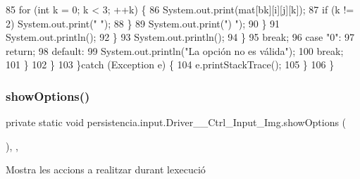 \begin{DoxyCode}
85                                 \textcolor{keywordflow}{for} (\textcolor{keywordtype}{int} k = 0; k < 3; ++k) \{
86                                     System.out.print(mat[bk][i][j][k]);
87                                     \textcolor{keywordflow}{if} (k != 2) System.out.print(\textcolor{stringliteral}{" "});
88                                 \}
89                                 System.out.print(\textcolor{stringliteral}{")  "});
90                             \}
91                             System.out.println();
92                         \}
93                         System.out.println();
94                     \}
95                 \textcolor{keywordflow}{break};
96                 \textcolor{keywordflow}{case} \textcolor{stringliteral}{"0"}:
97                     \textcolor{keywordflow}{return};
98                 \textcolor{keywordflow}{default}:
99                     System.out.println(\textcolor{stringliteral}{"La opción no es válida"});
100                 \textcolor{keywordflow}{break};
101             \}
102         \}
103     \}\textcolor{keywordflow}{catch} (Exception e) \{
104         e.printStackTrace();
105     \}
106     \}
\end{DoxyCode}
\mbox{\label{classpersistencia_1_1input_1_1Driver____Ctrl__Input__Img_a63892d1060c96a4478541bf0feff579d}} 
\subsubsection{\texorpdfstring{show\+Options()}{showOptions()}}
{\footnotesize\ttfamily private static void persistencia.\+input.\+Driver\+\_\+\+\_\+\+Ctrl\+\_\+\+Input\+\_\+\+Img.\+show\+Options (\begin{DoxyParamCaption}{ }\end{DoxyParamCaption})\hspace{0.3cm}{\ttfamily [inline]}, {\ttfamily [static]}, {\ttfamily [private]}}



Mostra les accions a realitzar durant l\textquotesingle{}execució 


